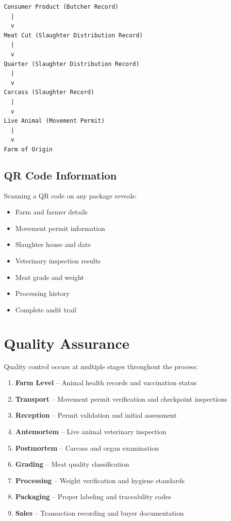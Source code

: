 \documentclass[11pt,a4paper]{article}
\begin{document}
\begin{center}
\begin{minipage}{0.6\textwidth}
\begin{verbatim}
Consumer Product (Butcher Record)
  |
  v
Meat Cut (Slaughter Distribution Record)
  |
  v
Quarter (Slaughter Distribution Record)
  |
  v
Carcass (Slaughter Record)
  |
  v
Live Animal (Movement Permit)
  |
  v
Farm of Origin
\end{verbatim}
\end{minipage}
\end{center}

\subsection{QR Code Information}

Scanning a QR code on any package reveals:

\begin{itemize}[leftmargin=*]
    \item Farm and farmer details
    \item Movement permit information
    \item Slaughter house and date
    \item Veterinary inspection results
    \item Meat grade and weight
    \item Processing history
    \item Complete audit trail
\end{itemize}

\section{Quality Assurance}

Quality control occurs at multiple stages throughout the process:

\begin{enumerate}[leftmargin=*]
    \item \textbf{Farm Level} -- Animal health records and vaccination status
    \item \textbf{Transport} -- Movement permit verification and checkpoint inspections
    \item \textbf{Reception} -- Permit validation and initial assessment
    \item \textbf{Antemortem} -- Live animal veterinary inspection
    \item \textbf{Postmortem} -- Carcass and organ examination
    \item \textbf{Grading} -- Meat quality classification
    \item \textbf{Processing} -- Weight verification and hygiene standards
    \item \textbf{Packaging} -- Proper labeling and traceability codes
    \item \textbf{Sales} -- Transaction recording and buyer documentation
\end{enumerate}
\end{document}
